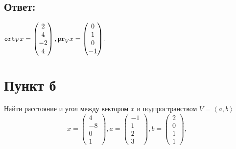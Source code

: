 \documentclass[12pt]{article}
\begin{document}
    \subsection*{Ответ:}
    $
    \texttt{ort}_{V} {x}
    =
    \begin{pmatrix}
        2  \\
        4  \\
        -2 \\
        4
    \end{pmatrix},
    \texttt{pr}_{V} {x}
    =
    \begin{pmatrix}
        0 \\
        1 \\
        0 \\
        -1
    \end{pmatrix}
    $.

    \section*{Пункт б}
    Найти расстояние и угол между вектором $x$ и подпространством $V = \left < a, b \right >$
    \[
        x =
        \begin{pmatrix}
            4 \\ -8 \\ 0 \\ 1
        \end{pmatrix},
        a =
        \begin{pmatrix}
            -1 \\ 1 \\ 2 \\ 3
        \end{pmatrix},
        b =
        \begin{pmatrix}
            2 \\ 0 \\ 1 \\ 1
        \end{pmatrix},
    \]
\end{document}
